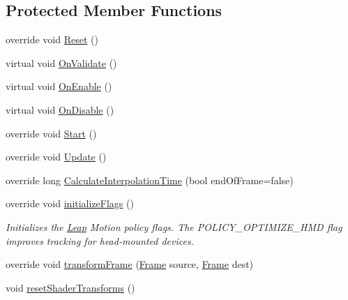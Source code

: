 \subsection*{Protected Member Functions}
\begin{DoxyCompactItemize}
\item 
override void \mbox{\hyperlink{class_leap_1_1_unity_1_1_leap_x_r_service_provider_abe79fe929f415f66f157d108b3f27aa5}{Reset}} ()
\item 
virtual void \mbox{\hyperlink{class_leap_1_1_unity_1_1_leap_x_r_service_provider_a40e506f8ae3cf42b5fb32676049e596e}{On\+Validate}} ()
\item 
virtual void \mbox{\hyperlink{class_leap_1_1_unity_1_1_leap_x_r_service_provider_ad970b245aba38c3c13b9358b91443808}{On\+Enable}} ()
\item 
virtual void \mbox{\hyperlink{class_leap_1_1_unity_1_1_leap_x_r_service_provider_ad9014e823bfcbb99666f23028dd7ff49}{On\+Disable}} ()
\item 
override void \mbox{\hyperlink{class_leap_1_1_unity_1_1_leap_x_r_service_provider_a0ff2b5db35ce36adb3ede2f63722a34e}{Start}} ()
\item 
override void \mbox{\hyperlink{class_leap_1_1_unity_1_1_leap_x_r_service_provider_a17b936b12ed7aabdf54af577a4de7f29}{Update}} ()
\item 
override long \mbox{\hyperlink{class_leap_1_1_unity_1_1_leap_x_r_service_provider_aafadeb0206fa3309e894ca7241535e81}{Calculate\+Interpolation\+Time}} (bool end\+Of\+Frame=false)
\item 
override void \mbox{\hyperlink{class_leap_1_1_unity_1_1_leap_x_r_service_provider_ae0e6b7d1c684d872acf237357ace286c}{initialize\+Flags}} ()
\begin{DoxyCompactList}\small\item\em Initializes the \mbox{\hyperlink{namespace_leap_1_1_unity_1_1_leap}{Leap}} Motion policy flags. The P\+O\+L\+I\+C\+Y\+\_\+\+O\+P\+T\+I\+M\+I\+Z\+E\+\_\+\+H\+MD flag improves tracking for head-\/mounted devices. \end{DoxyCompactList}\item 
override void \mbox{\hyperlink{class_leap_1_1_unity_1_1_leap_x_r_service_provider_a1bac02ff68b78b4e584567c6e4bf42ac}{transform\+Frame}} (\mbox{\hyperlink{class_leap_1_1_frame}{Frame}} source, \mbox{\hyperlink{class_leap_1_1_frame}{Frame}} dest)
\item 
void \mbox{\hyperlink{class_leap_1_1_unity_1_1_leap_x_r_service_provider_a9155994dde86e3946890433bfc536b9a}{reset\+Shader\+Transforms}} ()

\end{DoxyCompactItemize}
